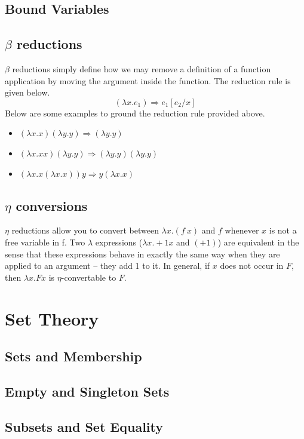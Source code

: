 \documentclass[a4paper,11pt]{article}
\begin{document}
\subsection{Bound Variables}

\subsection{$\beta$ reductions}
$\beta$ reductions simply define how we may remove a definition of a function application by moving the argument inside the function. The reduction rule is given below. 
$$
(\lambda x . e_1) \Rightarrow e_1[e_2/x]
$$
Below are some examples to ground the reduction rule provided above. 
\begin{itemize}
  \item $(\lambda x . x) (\lambda y . y) \Rightarrow (\lambda y . y)$
  \item $(\lambda x . x x) (\lambda y . y) \Rightarrow (\lambda y . y) (\lambda y . y)$
  \item $(\lambda x . x (\lambda x . x)) y \Rightarrow y (\lambda x . x )$
\end{itemize}

\subsection{$\eta$ conversions}
$\eta$ reductions allow you to convert between $\lambda x . (f \ x)$ and $f$ whenever $x$ is not a free variable 
in f. Two $\lambda$ expressions ($\lambda x . + 1 x$ and $(+ 1)$) are equivalent in the sense that these expressions behave in exactly the same way 
when they are applied to an argument -- they add 1 to it. In general, if $x$ does not occur in $F$, then $\lambda x . F x$ is $\eta$-convertable to $F$.

\section{Set Theory}
\subsection{Sets and Membership}

\subsection{Empty and Singleton Sets}

\subsection{Subsets and Set Equality}
\end{document}
